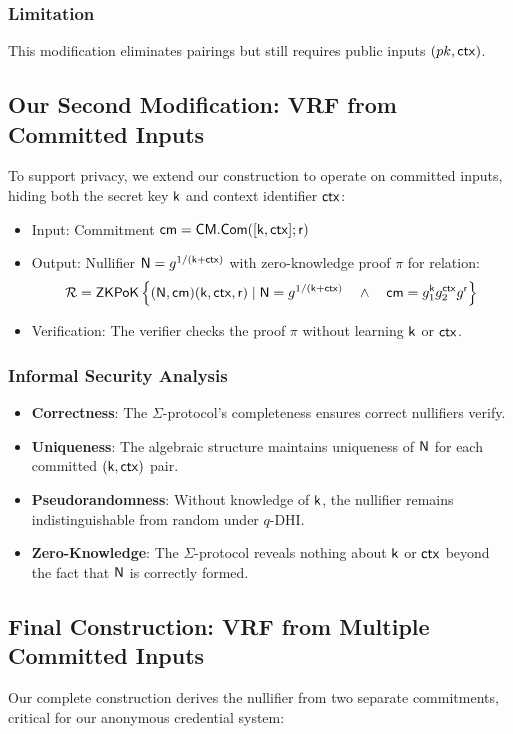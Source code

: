 \subsubsection{Limitation}
This modification eliminates pairings but still requires public inputs $(pk, \mathsf{ctx})$.

\subsection{Our Second Modification: VRF from Committed Inputs}
To support privacy, we extend our construction to operate on committed inputs, hiding both the secret key $\mathsf{k}$ and context identifier $\mathsf{ctx}$:

\begin{itemize}
    \item Input: Commitment $\mathsf{cm} = \mathsf{CM.Com}([\mathsf{k}, \mathsf{ctx}]; \mathsf{r})$
    \item Output: Nullifier $\mathsf{N} = g^{1/(\mathsf{k} + \mathsf{ctx})}$ with zero-knowledge proof $\pi$ for relation:
    \[
    \mathcal{R} = {\mathsf{ZKPoK}} \left\{ (\mathsf{N}, \mathsf{cm})(\mathsf{k}, \mathsf{ctx}, \mathsf{r}) \mid \mathsf{N} = g^{1/(\mathsf{k} + \mathsf{ctx})} \quad \wedge \quad \mathsf{cm} = g_1^{\mathsf{k}} g_2^{\mathsf{ctx}}g^{\mathsf{r}}  \right\}
    \]
    \item Verification: The verifier checks the proof $\pi$ without learning $\mathsf{k}$ or $\mathsf{ctx}$.
\end{itemize}

\subsubsection{Informal Security Analysis}
\begin{itemize}
    \item \textbf{Correctness}: The $\Sigma$-protocol's completeness ensures correct nullifiers verify.
    \item \textbf{Uniqueness}: The algebraic structure maintains uniqueness of $\mathsf{N}$ for each committed $(\mathsf{k},\mathsf{ctx})$ pair.
    \item \textbf{Pseudorandomness}: Without knowledge of $\mathsf{k}$, the nullifier remains indistinguishable from random under $q$-DHI.
    \item \textbf{Zero-Knowledge}: The $\Sigma$-protocol reveals nothing about $\mathsf{k}$ or $\mathsf{ctx}$ beyond the fact that $\mathsf{N}$ is correctly formed.
\end{itemize}

\subsection{Final Construction: VRF from Multiple Committed Inputs}
Our complete construction derives the nullifier from two separate commitments, critical for our anonymous credential system:

